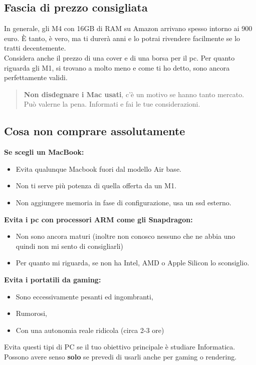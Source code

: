 \documentclass[18pt]{extarticle}
\begin{document}
\subsection{Fascia di prezzo consigliata}
In generale, gli M4 con 16GB di RAM su Amazon arrivano spesso intorno ai 900 euro.  
È tanto, è vero, ma ti durerà anni e lo potrai rivendere facilmente se lo tratti decentemente.\\
Considera anche il prezzo di una cover e di una borsa per il pc. 
Per quanto riguarda gli M1, si trovano a molto meno e come ti ho detto, sono ancora perfettamente validi. 
\begin{quote}
\textbf{Non disdegnare i Mac usati}, c'è un motivo se hanno tanto mercato. Può valerne la pena. Informati e fai le tue considerazioni.
\end{quote}


\subsection{Cosa non comprare assolutamente}
\textbf{Se scegli un MacBook:}
\begin{itemize}
\item Evita qualunque Macbook fuori dal modello Air base.
\item Non ti serve più potenza di quella offerta da un M1.
\item Non aggiungere memoria in fase di configurazione, usa un ssd esterno.
\end{itemize}%
\textbf{Evita i pc con processori ARM come gli Snapdragon:}
\begin{itemize}
\item Non sono ancora maturi (inoltre non conosco nessuno che ne abbia uno quindi non mi sento di consigliarli)
\item Per quanto mi riguarda, se non ha Intel, AMD o Apple Silicon lo sconsiglio.
\end{itemize}%
\textbf{Evita i portatili da gaming:}
\begin{itemize}
\item Sono eccessivamente pesanti ed ingombranti,
\item Rumorosi,
\item Con una autonomia reale ridicola (circa 2-3 ore)
\end{itemize}%
Evita questi tipi di PC se il tuo obiettivo principale è studiare Informatica. Possono avere senso \textbf{solo} se prevedi di usarli anche per gaming o rendering.
\end{document}
